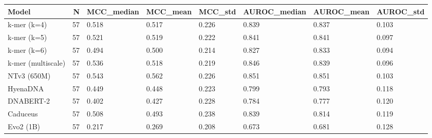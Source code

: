 \begin{tabular}{lrllllll}
\toprule
Model & N & MCC_median & MCC_mean & MCC_std & AUROC_median & AUROC_mean & AUROC_std \\
\midrule
k-mer (k=4) & 57 & 0.518 & 0.517 & 0.226 & 0.839 & 0.837 & 0.103 \\
k-mer (k=5) & 57 & 0.521 & 0.519 & 0.222 & 0.841 & 0.841 & 0.097 \\
k-mer (k=6) & 57 & 0.494 & 0.500 & 0.214 & 0.827 & 0.833 & 0.094 \\
k-mer (multiscale) & 57 & 0.536 & 0.518 & 0.219 & 0.846 & 0.839 & 0.096 \\
NTv3 (650M) & 57 & 0.543 & 0.562 & 0.226 & 0.851 & 0.851 & 0.103 \\
HyenaDNA & 57 & 0.449 & 0.448 & 0.223 & 0.799 & 0.793 & 0.118 \\
DNABERT-2 & 57 & 0.402 & 0.427 & 0.228 & 0.784 & 0.777 & 0.120 \\
Caduceus & 57 & 0.508 & 0.493 & 0.238 & 0.839 & 0.814 & 0.119 \\
Evo2 (1B) & 57 & 0.217 & 0.269 & 0.208 & 0.673 & 0.681 & 0.128 \\
\bottomrule
\end{tabular}
